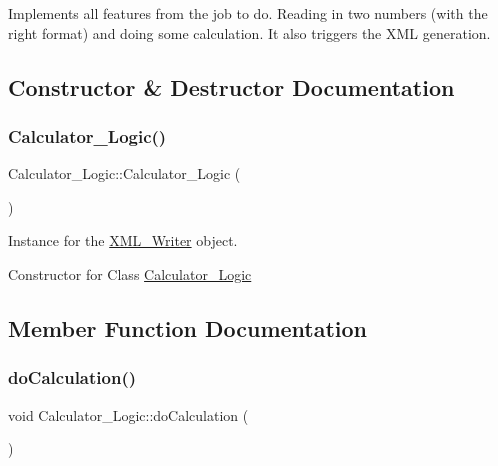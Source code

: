Implements all features from the job to do. Reading in two numbers (with the right format) and doing some calculation. It also triggers the X\+ML generation. 

\subsection{Constructor \& Destructor Documentation}
\mbox{\label{class_calculator___logic_a27b85b3ddd41cecb9df8eae25abac7d8}} 
\subsubsection{\texorpdfstring{Calculator\+\_\+\+Logic()}{Calculator\_Logic()}}
{\footnotesize\ttfamily Calculator\+\_\+\+Logic\+::\+Calculator\+\_\+\+Logic (\begin{DoxyParamCaption}{ }\end{DoxyParamCaption})}



Instance for the \mbox{\hyperlink{class_x_m_l___writer}{X\+M\+L\+\_\+\+Writer}} object. 

Constructor for Class \mbox{\hyperlink{class_calculator___logic}{Calculator\+\_\+\+Logic}} 

\subsection{Member Function Documentation}
\mbox{\label{class_calculator___logic_abcda28576f17aaa75e3088b70668e3ab}} 
\subsubsection{\texorpdfstring{do\+Calculation()}{doCalculation()}}
{\footnotesize\ttfamily void Calculator\+\_\+\+Logic\+::do\+Calculation (\begin{DoxyParamCaption}{ }\end{DoxyParamCaption})}




